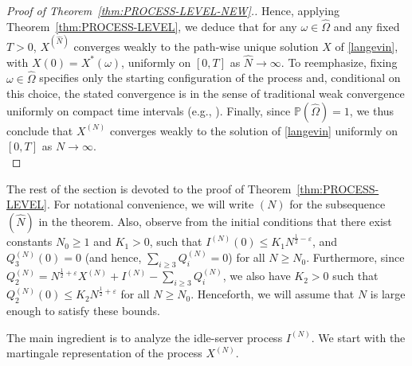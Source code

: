 \documentclass[11pt, reqno]{article}
\numberwithin{equation}{section}
\numberwithin{theorem}{section}
\newcommand\blue[1]{#1}
\begin{document}
{\begin{proof}[Proof of Theorem~\ref{thm:PROCESS-LEVEL-NEW}.]
Hence, applying Theorem~\ref{thm:PROCESS-LEVEL}, 
we deduce that for any $\omega \in \hat{\Omega}$ and any fixed $T>0$, $X^{(\hat{N})}$ converges weakly to the path-wise unique solution $X$ of \eqref{langevin}, with $X(0)=X^*(\omega)$, uniformly on $[0,T]$ as $\hat{N} \rightarrow \infty$. To reemphasize, fixing $\omega \in \hat{\Omega}$ specifies only the starting configuration of the process and, conditional on this choice, the stated convergence is in the sense of traditional weak convergence uniformly on compact time intervals (e.g., \cite[Chapter 3]{billingsley2013convergence}).
Finally, since $\mathbb{P}(\hat{\Omega}) = 1$, we thus conclude that $X^{(N)}$ converges weakly to the solution of \eqref{langevin} uniformly on $[0,T]$ as $N \rightarrow \infty$.\\
\end{proof}
}




The rest of the section is devoted to the proof of Theorem~\ref{thm:PROCESS-LEVEL}. \blue{For notational convenience, we will write $(N)$ for the subsequence $(\hat{N})$ in the theorem.
Also, observe from the initial conditions that there exist constants $N_0\geq 1$ and $K_1>0$, such that $I^{(N)}(0)\leq K_1N^{\frac{1}{2}-\varepsilon}$, and $Q^{(N)}_3(0)=0$ (and hence, $\sum_{i\geq 3}Q^{(N)}_i = 0$) for all $N\geq N_0$. 
Furthermore, since $Q^{(N)}_2= N^{\frac{1}{2}+\varepsilon}X^{(N)} + I^{(N)} - \sum_{i\geq 3}Q^{(N)}_i$, we also have $K_2>0$ such that 
$Q^{(N)}_2(0)\leq K_2 N^{\frac{1}{2}+\varepsilon}$ for all $N\geq N_0$.
Henceforth, we will assume that $N$ is large enough to satisfy these bounds.}

The main ingredient is to analyze the idle-server process $I^{(N)}$.
We start with the martingale representation of the process $X^{(N)}$.
\end{document}
